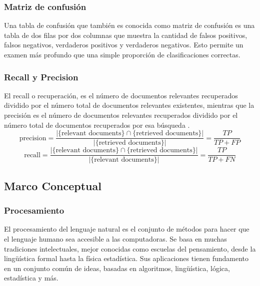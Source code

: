 \documentclass[12pt]{article}
\begin{document}
			
			\subsubsection{Matriz de confusión}
			Una tabla de confusión que también es conocida como matriz de confusión es una tabla de dos filas por dos columnas que muestra la cantidad de falsos positivos, falsos negativos, verdaderos positivos y verdaderos negativos. Esto permite un examen más profundo que una simple proporción de clasificaciones correctas. \cite{Bandi2013}
			
			\subsubsection{Recall y Precision}
			El recall o recuperación, es el número de documentos relevantes recuperados dividido por el número total de documentos relevantes existentes, mientras que la precisión es el número de documentos relevantes recuperados dividido por el número total de documentos recuperados por esa búsqueda \cite{Gupta2010}.
			\begin{equation}\label{eq:Precision}
			\text{precision}= \frac {|\{{\text{relevant documents}}\}\cap \{{\text{retrieved documents}}\}|}{|\{{\text{retrieved documents}}\}|} = \frac{TP}{TP + FP}
			\end{equation}
			\begin{equation}\label{eq:Recall}
			\text{recall}={\frac {|\{{\text{relevant documents}}\}\cap \{{\text{retrieved documents}}\}|}{|\{{\text{relevant documents}}\}|}} = \frac{TP}{TP + FN}
			\end{equation}

			
		\subsection{Marco Conceptual}
		\subsubsection{Procesamiento}
		El procesamiento del lenguaje natural es el conjunto de métodos para hacer que el lenguaje humano sea accesible a las computadoras. Se basa en muchas tradiciones intelectuales, mejor conocidas como escuelas del pensamiento, desde la lingüística formal hasta la física estadística. Sus aplicaciones tienen fundamento en un conjunto común de ideas, basadas en algoritmos, lingüística, lógica, estadística y más. \cite{Eisenstein2019}
		
\end{document}
